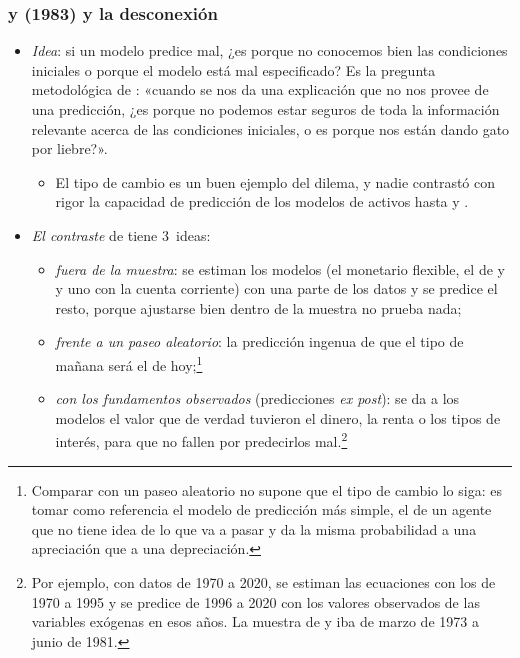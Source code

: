 \documentclass[11pt]{article}
\begin{document}
\subsubsection{ y  (1983) y la desconexión}\label{sec:meese-rogoff}

\begin{itemize}
\item \emph{Idea}: si un modelo predice mal, ¿es porque no conocemos bien las condiciones iniciales o porque el modelo está mal especificado? Es la pregunta metodológica de \textcite{Blaug1980Methodology}: «cuando se nos da una explicación que no nos provee de una predicción, ¿es porque no podemos estar seguros de toda la información relevante acerca de las condiciones iniciales, o es porque nos están dando gato por liebre?».
  \begin{itemize}
  \item El tipo de cambio es un buen ejemplo del dilema, y nadie contrastó con rigor la capacidad de predicción de los modelos de activos hasta  y .
  \end{itemize}
\item \emph{El contraste} de \textcite{MeeseRogoff1983} tiene 3~ideas:
  \begin{itemize}
  \item \emph{fuera de la muestra}: se estiman los modelos (el monetario flexible, el de  y  y uno con la cuenta corriente) con una parte de los datos y se predice el resto, porque ajustarse bien dentro de la muestra no prueba nada;
  \item \emph{frente a un paseo aleatorio}: la predicción ingenua de que el tipo de mañana será el de hoy;\footnote{Comparar con un paseo aleatorio no supone que el tipo de cambio lo siga: es tomar como referencia el modelo de predicción más simple, el de un agente que no tiene idea de lo que va a pasar y da la misma probabilidad a una apreciación que a una depreciación.}
  \item \emph{con los fundamentos observados} (predicciones \emph{ex post}): se da a los modelos el valor que de verdad tuvieron el dinero, la renta o los tipos de interés, para que no fallen por predecirlos mal.\footnote{Por ejemplo, con datos de 1970 a 2020, se estiman las ecuaciones con los de 1970 a 1995 y se predice de 1996 a 2020 con los valores observados de las variables exógenas en esos años. La muestra de  y  iba de marzo de 1973 a junio de 1981.}
  \end{itemize}

\end{itemize}
\end{document}
